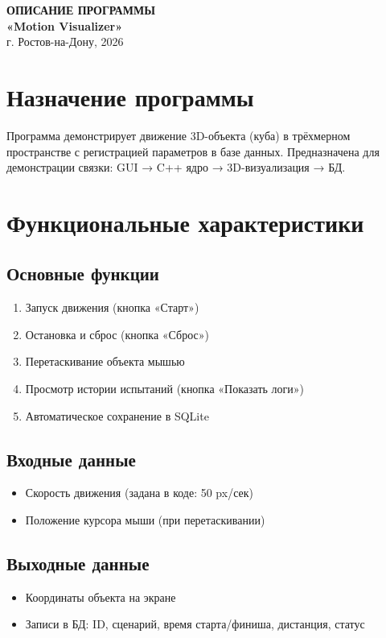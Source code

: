 \documentclass[a4paper,14pt]{extarticle}
\begin{document}
\begin{titlepage}
\begin{center}
\vspace*{2cm}
{\Large \textbf{ОПИСАНИЕ ПРОГРАММЫ}} \\
\vspace{0.5cm}
{\large \textbf{«Motion Visualizer»}} \\
\vspace{0.5cm}
\vfill
г. Ростов-на-Дону, 2026
\end{center}
\end{titlepage}

\section{Назначение программы}
Программа демонстрирует движение 3D-объекта (куба) в трёхмерном пространстве с регистрацией параметров в базе данных. Предназначена для демонстрации связки: GUI → C++ ядро → 3D-визуализация → БД.

\section{Функциональные характеристики}

\subsection{Основные функции}
\begin{enumerate}
    \item Запуск движения (кнопка «Старт»)
    \item Остановка и сброс (кнопка «Сброс»)
    \item Перетаскивание объекта мышью
    \item Просмотр истории испытаний (кнопка «Показать логи»)
    \item Автоматическое сохранение в SQLite
\end{enumerate}

\subsection{Входные данные}
\begin{itemize}
    \item Скорость движения (задана в коде: 50 px/сек)
    \item Положение курсора мыши (при перетаскивании)
\end{itemize}

\subsection{Выходные данные}
\begin{itemize}
    \item Координаты объекта на экране
    \item Записи в БД: ID, сценарий, время старта/финиша, дистанция, статус
\end{itemize}
\end{document}
